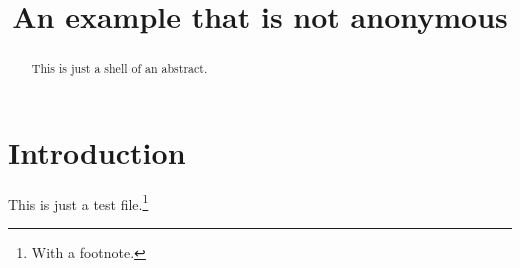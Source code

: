 \documentclass{iacrcc}
\title[running  = {The iacrcc class},
       subtitle = {A Template}
      ]{An example that is not anonymous}
\begin{document}
\maketitle


\begin{abstract}
This is just a shell of an abstract.
\end{abstract}

\section{Introduction}
This is just a test file.\footnote{With a footnote.}
\end{document}
